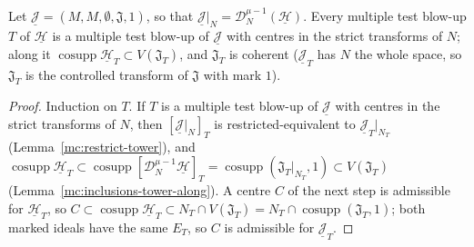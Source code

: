 \begin{lemma}
\label{mc:glue-tower-along}
\leanok
Let \(\underline{\mathcal J}=(M,M,\emptyset,\mathfrak J,1)\), so that \(\underline{\mathcal J}|_N=\mathcal D_N^{\mu-1}(\underline{\mathcal H})\). Every multiple test blow-up \(T\) of
\(\underline{\mathcal H}\) is a multiple test blow-up of \(\underline{\mathcal J}\) with centres in the strict transforms of \(N\); along it
\(\operatorname{cosupp}\underline{\mathcal H}_T\subset V(\mathfrak J_T)\), and \(\mathfrak J_T\) is coherent (\(\underline{\mathcal J}_T\) has \(N\) the whole space, so \(\mathfrak J_T\) is
the controlled transform of \(\mathfrak J\) with mark \(1\)).
\end{lemma}
\begin{proof}
\leanok
Induction on \(T\). If \(T\) is a multiple test blow-up of \(\underline{\mathcal J}\) with centres in the strict transforms of \(N\), then
\([\underline{\mathcal J}|_N]_T\) is restricted-equivalent to \(\underline{\mathcal J}_T|_{N_T}\) (Lemma~\ref{mc:restrict-tower}), and
\(\operatorname{cosupp}\underline{\mathcal H}_T\subset\operatorname{cosupp}[\mathcal D_N^{\mu-1}\underline{\mathcal H}]_T=\operatorname{cosupp}(\mathfrak J_T|_{N_T},1)\subset V(\mathfrak J_T)\)
(Lemma~\ref{mc:inclusions-tower-along}). A centre \(C\) of the next step is admissible for \(\underline{\mathcal H}_T\), so \(C\subset\operatorname{cosupp}\underline{\mathcal H}_T\subset
N_T\cap V(\mathfrak J_T)=N_T\cap\operatorname{cosupp}(\mathfrak J_T,1)\); both marked ideals have the same \(E_T\), so \(C\) is admissible for \(\underline{\mathcal J}_T\).
\end{proof}

